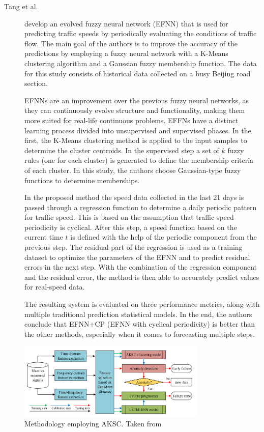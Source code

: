 \begin{description}
    \item[Tang et al.]\cite{Tang.Liu.ea_ImprovedFuzzyNeural_2017} develop an evolved fuzzy neural network (EFNN) that is used for predicting traffic speeds by periodically evaluating the conditions of traffic flow. The main goal of the authors is to improve the accuracy of the predictions by employing a fuzzy neural network with a K-Means clustering algorithm and a Gaussian fuzzy membership function. The data for this study consists of historical data collected on a busy Beijing road section. 
    
    EFNNs are an improvement over the previous fuzzy neural networks, as they can continuously evolve structure and functionality, making them more suited for real-life continuous problems. EFFNs have a distinct learning process divided into unsupervised and supervised phases. In the first, the K-Means clustering method is applied to the input samples to determine the cluster centroids. In the supervised step a set of $k$ fuzzy rules (one for each cluster) is generated to define the membership criteria of each cluster. In this study, the authors choose Gaussian-type fuzzy functions to determine memberships.

    In the proposed method the speed data collected in the last 21 days is passed through a regression function to determine a daily periodic pattern for traffic speed. This is based on the assumption that traffic speed periodicity is cyclical. After this step, a speed function based on the current time $t$ is defined with the help of the periodic component from the previous step. The residual part of the regression is used as a training dataset to optimize the parameters of the EFNN and to predict residual errors in the next step. With the combination of the regression component and the residual error, the method is then able to accurately predict values for real-speed data.

    The resulting system is evaluated on three performance metrics, along with multiple traditional prediction statistical models. In the end, the authors conclude that EFNN+CP (EFNN with cyclical periodicity) is better than the other methods, especially when it comes to forecasting multiple steps.
\end{description}


\begin{figure}[h]
    \centering
    \includegraphics[width=0.8\textwidth]{figures/aksc_arch.png}
    \caption{Methodology employing AKSC. Taken from \cite{Cheng.Zhu.ea_MachineHealthMonitoring_2019}}
    \label{fig:aksc}
\end{figure}

